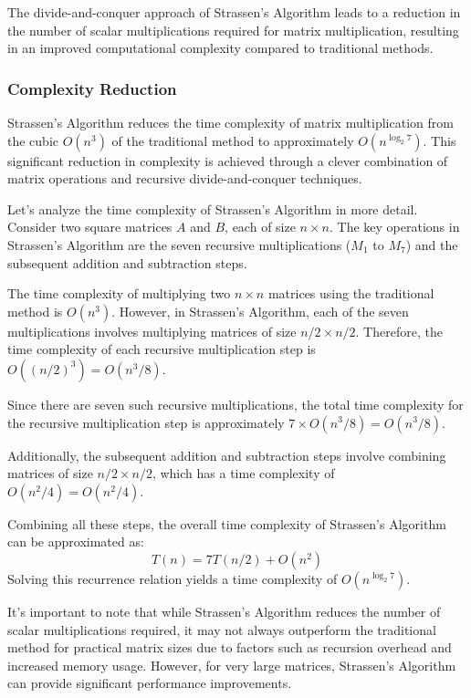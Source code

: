 \documentclass[12pt]{book} %
\begin{document}
The divide-and-conquer approach of Strassen's Algorithm leads to a reduction in the number of scalar multiplications required for matrix multiplication, resulting in an improved computational complexity compared to traditional methods.

\subsubsection{Complexity Reduction}
Strassen's Algorithm reduces the time complexity of matrix multiplication from the cubic $O(n^3)$ of the traditional method to approximately $O(n^{\log_2{7}})$. This significant reduction in complexity is achieved through a clever combination of matrix operations and recursive divide-and-conquer techniques.

Let's analyze the time complexity of Strassen's Algorithm in more detail. Consider two square matrices $A$ and $B$, each of size $n \times n$. The key operations in Strassen's Algorithm are the seven recursive multiplications ($M_1$ to $M_7$) and the subsequent addition and subtraction steps. 

The time complexity of multiplying two $n \times n$ matrices using the traditional method is $O(n^3)$. However, in Strassen's Algorithm, each of the seven multiplications involves multiplying matrices of size $n/2 \times n/2$. Therefore, the time complexity of each recursive multiplication step is $O((n/2)^3) = O(n^3/8)$.

Since there are seven such recursive multiplications, the total time complexity for the recursive multiplication step is approximately $7 \times O(n^3/8) = O(n^3/8)$. 

Additionally, the subsequent addition and subtraction steps involve combining matrices of size $n/2 \times n/2$, which has a time complexity of $O(n^2/4) = O(n^2/4)$. 

Combining all these steps, the overall time complexity of Strassen's Algorithm can be approximated as:
\[
T(n) = 7T(n/2) + O(n^2)
\]
Solving this recurrence relation yields a time complexity of $O(n^{\log_2{7}})$.

It's important to note that while Strassen's Algorithm reduces the number of scalar multiplications required, it may not always outperform the traditional method for practical matrix sizes due to factors such as recursion overhead and increased memory usage. However, for very large matrices, Strassen's Algorithm can provide significant performance improvements.
\end{document}
